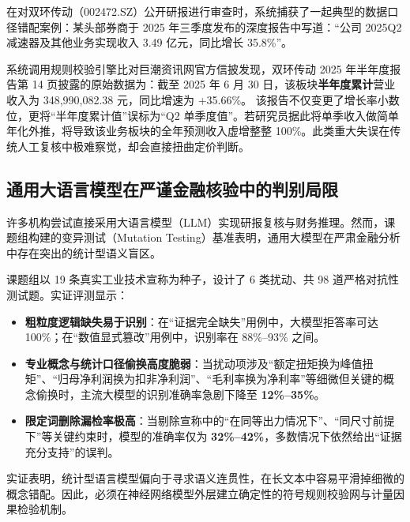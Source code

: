 \documentclass[11pt,a4paper]{ctexart}
\begin{document}
\begin{casebox}
在对双环传动（002472.SZ）公开研报进行审查时，系统捕获了一起典型的数据口径错配案例：某头部券商于 2025 年三季度发布的深度报告中写道：“公司 2025Q2 减速器及其他业务实现收入 3.49 亿元，同比增长 35.8\%”。

系统调用规则校验引擎比对巨潮资讯网官方信披发现，双环传动 2025 年半年度报告第 14 页披露的原始数据为：截至 2025 年 6 月 30 日，该板块\textbf{半年度累计}营业收入为 348,990,082.38 元，同比增速为 +35.66\%。
该报告不仅变更了增长率小数位，更将“半年度累计值”误标为“Q2 单季度值”。若研究员据此将单季收入做简单年化外推，将导致该业务板块的全年预测收入虚增整整 100\%。此类重大失误在传统人工复核中极难察觉，却会直接扭曲定价判断。
\end{casebox}

\subsection{通用大语言模型在严谨金融核验中的判别局限}

许多机构尝试直接采用大语言模型（LLM）实现研报复核与财务推理。然而，课题组构建的变异测试（Mutation Testing）基准表明，通用大模型在严肃金融分析中存在突出的统计型语义盲区。

课题组以 19 条真实工业技术宣称为种子，设计了 6 类扰动、共 98 道严格对抗性测试题。实证评测显示：
\begin{itemize}
  \item \textbf{粗粒度逻辑缺失易于识别}：在“证据完全缺失”用例中，大模型拒答率可达 100\%；在“数值显式篡改”用例中，识别率在 88\%--93\% 之间。
  \item \textbf{专业概念与统计口径偷换高度脆弱}：当扰动项涉及“额定扭矩换为峰值扭矩”、“归母净利润换为扣非净利润”、“毛利率换为净利率”等细微但关键的概念偷换时，主流大模型的识别准确率急剧下降至 \textbf{12\%--35\%}。
  \item \textbf{限定词删除漏检率极高}：当剔除宣称中的“在同等出力情况下”、“同尺寸前提下”等关键约束时，模型的准确率仅为 \textbf{32\%--42\%}，多数情况下依然给出“证据充分支持”的误判。
\end{itemize}

实证表明，统计型语言模型偏向于寻求语义连贯性，在长文本中容易平滑掉细微的概念错配。因此，必须在神经网络模型外层建立确定性的符号规则校验网与计量因果检验机制。

\end{document}
